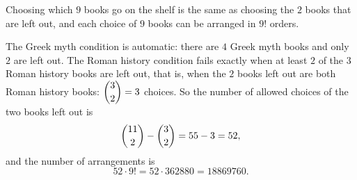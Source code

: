 Choosing which $9$ books go on the shelf is the same as choosing the $2$ books that are left out, and each choice of $9$ books can be arranged in $9!$ orders.

The Greek myth condition is automatic: there are $4$ Greek myth books and only $2$ are left out. The Roman history condition fails exactly when at least $2$ of the $3$ Roman history books are left out, that is, when the $2$ books left out are both Roman history books: $\dbinom32=3$ choices. So the number of allowed choices of the two books left out is
\[\dbinom{11}{2}-\dbinom32=55-3=52,\]
and the number of arrangements is
\[52\cdot9!=52\cdot362880=\boxed{18869760}.\]
